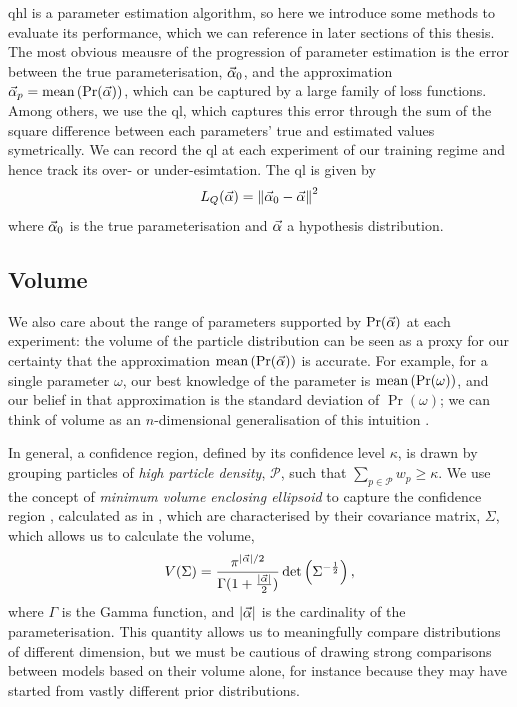 \gls{qhl} is a parameter estimation algorithm, so here we introduce some methods to evaluate its performance, 
    which we can reference in later sections of this thesis. 
The most obvious meausre of the progression of parameter estimation is the error between the true parameterisation, 
    $\vec{\alpha}_0$, and the approximation $\vec{\alpha}_p = \textrm{mean} \left( \Pr(\vec{\alpha}) \right)$,
    which can be captured by a large family of loss functions. 
Among others, we use the \gls{ql}, which captures this error through the sum of the square difference between 
    each parameters' true and estimated values symetrically.
We can record the \gls{ql} at each experiment of our training regime and hence track its over- or under-esimtation. 
The \gls{ql} is given by 
    \begin{equation}
        \label{eqn:quadratic_loss}
        L_{Q}(\vec{\alpha}) = \left\| \vec{\alpha}_0 - \vec{\alpha} \right\|^2
    \end{equation}
    where $\vec{\alpha}_0$ is the true parameterisation and $\vec{\alpha}$ a hypothesis distribution.
\par 

\subsection{Volume}\label{sec:volume}
We also care about the range of parameters supported by $\Pr(\vec{\alpha})$ at each experiment: 
    the \gls{volume} of the particle distribution can be seen as a proxy for our certainty
    that the approximation $\textrm{mean}\left(\Pr(\vec{\alpha})\right) $ is accurate. 
For example, for a single parameter $\omega$, our best knowledge of the parameter is $\textrm{mean}\left( \Pr(\omega) \right)$, 
    and our belief in that approximation is the standard deviation of $\Pr(\omega)$; 
    we can think of \gls{volume} as an $n$-dimensional generalisation of this intuition \cite{qinfer-1_0, ferrie2014high}. 
\par 
In general, a confidence region, defined by its confidence level $\kappa$, is drawn by grouping particles 
    of \emph{high particle density}, $\mathcal{P}$, such that $\sum\limits_{p \in \mathcal{P}} w_{p} \geq \kappa$.
We use the concept of \emph{minimum volume enclosing ellipsoid}
    to capture the confidence region \cite{ferrie2014high}, calculated as in \cite{todd2007khachiyan}, 
    which are characterised by their covariance matrix, $\Sigma$, which allows us to calculate the \gls{volume}, 
    \begin{equation}
        \label{eqn:volume}
        V(\Sigma) = \frac{ \pi^{| \vec{\alpha} | / 2}}{ \Gamma(1 + \frac{| \vec{\alpha} |}{2})} \det\left(\Sigma^{-\frac{1}{2}}\right),
    \end{equation}
    where $\Gamma$ is the Gamma function, and $|\vec{\alpha}|$ is the cardinality of the parameterisation. 
This quantity allows us to meaningfully compare distributions of different dimension, 
    but we must be cautious of drawing strong comparisons between models based on 
    their \gls{volume} alone, for instance because they may have started from vastly different prior distributions. 
\par 

